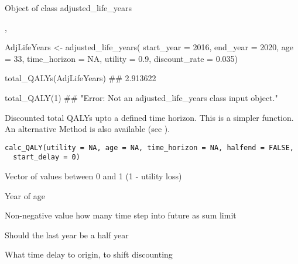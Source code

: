 \documentclass[a4paper]{book}
\begin{document}
%
\begin{Value}
Object of class adjusted\_life\_years
\end{Value}
%
\begin{SeeAlso}\relax
{}, 
\end{SeeAlso}
%
\begin{Examples}
\begin{ExampleCode}

AdjLifeYears <- adjusted_life_years(
                    start_year = 2016,
                    end_year = 2020,
                    age = 33,
                    time_horizon = NA,
                    utility = 0.9,
                    discount_rate = 0.035)

total_QALYs(AdjLifeYears)
## 2.913622

total_QALY(1)
## "Error: Not an adjusted_life_years class input object."

\end{ExampleCode}
\end{Examples}
%
\begin{Description}\relax
Discounted total QALYs upto a defined time horizon.
This is a simpler function.
An alternative Method is also available (see ).
\end{Description}
%
\begin{Usage}
\begin{verbatim}
calc_QALY(utility = NA, age = NA, time_horizon = NA, halfend = FALSE,
  start_delay = 0)
\end{verbatim}
\end{Usage}
%
\begin{Arguments}
\begin{ldescription}
\item[\code{utility}] Vector of values between 0 and 1 (1 - utility loss)

\item[\code{age}] Year of age

\item[\code{time\_horizon}] Non-negative value how many time step into future as sum limit

\item[\code{halfend}] Should the last year be a half year

\item[\code{start\_delay}] What time delay to origin, to shift discounting
\end{ldescription}
\end{Arguments}
\end{document}
